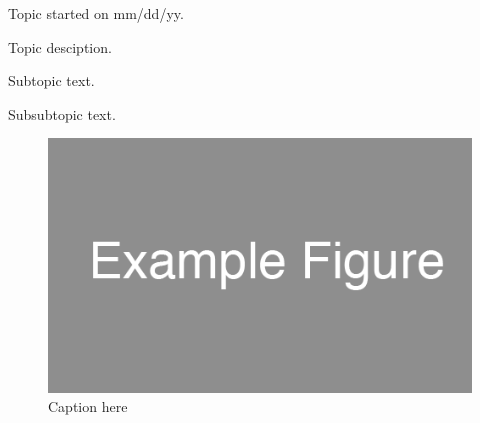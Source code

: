 \documentclass[hyperref]{ROLatex/notebook}
\begin{document}

\frontmatter %

\date{Month DD, YYYY}

\maketitle
\tableofcontents

\mainmatter %

Topic started on mm/dd/yy.

Topic desciption.


Subtopic text.


Subsubtopic text.

\begin{figure}[]
  \centering
  \includegraphics[width=.5\textwidth]{example_figure.png}
  \caption{Caption here}
  \label{fig:1}
\end{figure}

\end{document}

